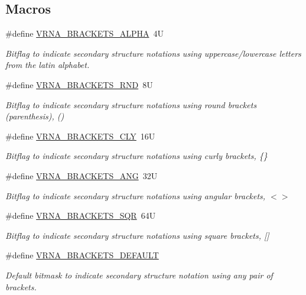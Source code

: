 \subsection*{Macros}
\begin{DoxyCompactItemize}
\item 
\#define \hyperlink{group__struct__utils_ga7e3f630af8d69bb0e917145aacf2f96d}{V\+R\+N\+A\+\_\+\+B\+R\+A\+C\+K\+E\+T\+S\+\_\+\+A\+L\+P\+HA}~4U
\begin{DoxyCompactList}\small\item\em Bitflag to indicate secondary structure notations using uppercase/lowercase letters from the latin alphabet. \end{DoxyCompactList}\item 
\#define \hyperlink{group__struct__utils_gac92d5fa7c6625bce2670ece510a24fbd}{V\+R\+N\+A\+\_\+\+B\+R\+A\+C\+K\+E\+T\+S\+\_\+\+R\+ND}~8U
\begin{DoxyCompactList}\small\item\em Bitflag to indicate secondary structure notations using round brackets (parenthesis), {\ttfamily ()} \end{DoxyCompactList}\item 
\#define \hyperlink{group__struct__utils_gaf41be40e79cb756c4e0bb8edb4d803d2}{V\+R\+N\+A\+\_\+\+B\+R\+A\+C\+K\+E\+T\+S\+\_\+\+C\+LY}~16U
\begin{DoxyCompactList}\small\item\em Bitflag to indicate secondary structure notations using curly brackets, {\ttfamily \{\}} \end{DoxyCompactList}\item 
\#define \hyperlink{group__struct__utils_ga863e03f7f73f10fc9bbcbefbdda4bec8}{V\+R\+N\+A\+\_\+\+B\+R\+A\+C\+K\+E\+T\+S\+\_\+\+A\+NG}~32U
\begin{DoxyCompactList}\small\item\em Bitflag to indicate secondary structure notations using angular brackets, {\ttfamily $<$$>$} \end{DoxyCompactList}\item 
\#define \hyperlink{group__struct__utils_ga60525d61d7496eeea490a37f3d6bf757}{V\+R\+N\+A\+\_\+\+B\+R\+A\+C\+K\+E\+T\+S\+\_\+\+S\+QR}~64U
\begin{DoxyCompactList}\small\item\em Bitflag to indicate secondary structure notations using square brackets, {\ttfamily \mbox{[}\mbox{]}} \end{DoxyCompactList}\item 
\#define \hyperlink{group__struct__utils_ga559ebf76b1b289f85309f4206e99aa1a}{V\+R\+N\+A\+\_\+\+B\+R\+A\+C\+K\+E\+T\+S\+\_\+\+D\+E\+F\+A\+U\+LT}
\begin{DoxyCompactList}\small\item\em Default bitmask to indicate secondary structure notation using any pair of brackets. \end{DoxyCompactList}\end{DoxyCompactItemize}
